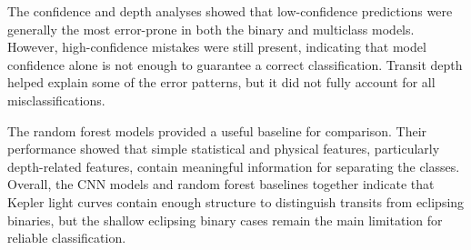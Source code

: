 The confidence and depth analyses showed that low-confidence predictions were generally the most error-prone in both the binary and multiclass models. However, high-confidence mistakes were still present, indicating that model confidence alone is not enough to guarantee a correct classification. Transit depth helped explain some of the error patterns, but it did not fully account for all misclassifications.

The random forest models provided a useful baseline for comparison. Their performance showed that simple statistical and physical features, particularly depth-related features, contain meaningful information for separating the classes. Overall, the CNN models and random forest baselines together indicate that Kepler light curves contain enough structure to distinguish transits from eclipsing binaries, but the shallow eclipsing binary cases remain the main limitation for reliable classification.

